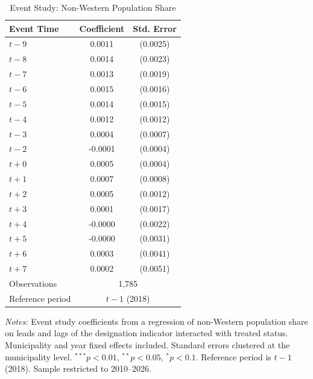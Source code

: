 \begin{table}[htbp]
\centering
\caption{Event Study: Non-Western Population Share}
\label{tab:eventstudy}
\begin{tabular}{lcc}
\hline\hline
Event Time & Coefficient & Std. Error \\
\hline
$t - 9$ & 0.0011 & (0.0025) \\
$t - 8$ & 0.0014 & (0.0023) \\
$t - 7$ & 0.0013 & (0.0019) \\
$t - 6$ & 0.0015 & (0.0016) \\
$t - 5$ & 0.0014 & (0.0015) \\
$t - 4$ & 0.0012 & (0.0012) \\
$t - 3$ & 0.0004 & (0.0007) \\
$t - 2$ & -0.0001 & (0.0004) \\
$t + 0$ & 0.0005 & (0.0004) \\
$t + 1$ & 0.0007 & (0.0008) \\
$t + 2$ & 0.0005 & (0.0012) \\
$t + 3$ & 0.0001 & (0.0017) \\
$t + 4$ & -0.0000 & (0.0022) \\
$t + 5$ & -0.0000 & (0.0031) \\
$t + 6$ & 0.0003 & (0.0041) \\
$t + 7$ & 0.0002 & (0.0051) \\
\hline
Observations & \multicolumn{2}{c}{1,785} \\
Reference period & \multicolumn{2}{c}{$t - 1$ (2018)} \\
\hline\hline
\end{tabular}
\begin{tablenotes}[flushleft]
\small
\item \textit{Notes:} Event study coefficients from a regression of non-Western population share on leads and lags of the designation indicator interacted with treated status. Municipality and year fixed effects included. Standard errors clustered at the municipality level. $^{***}p<0.01$, $^{**}p<0.05$, $^{*}p<0.1$. Reference period is $t-1$ (2018). Sample restricted to 2010--2026.
\end{tablenotes}
\end{table}
